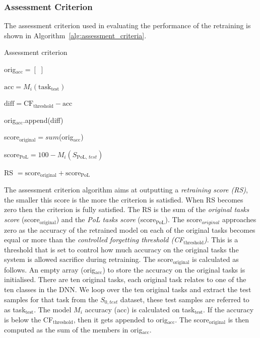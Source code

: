 \subsubsection{Assessment Criterion}
The assessment criterion used in evaluating the performance of the retraining is shown in Algorithm~\ref{alg:assessment_criteria}.
%
\begin{algorithm}
\caption{Assessment criterion}\label{alg:assessment_criteria}
\begin{algorithmic}
\State orig$_{\text{acc}} = [\text{~}]$



\State $\text{acc} = M_i(\text{task}_{\text{test}})$

\State $\text{diff} = \text{CF}_{\text{threshold}} - \text{acc}$


    \State orig$_{\text{acc}}$.append(diff)
    
\EndIf


\EndFor

\State score$_{\text{original}} = sum$(orig$_{\text{acc}}$)

\State score$_{\text{PoL}} = 100 - M_i(S_{\text{PoL, }test})$

\State RS $= \text{score}_{\text{original}} + \text{score}_{\text{PoL}}$

\end{algorithmic}
\end{algorithm}
%
The assessment criterion algorithm aims at outputting a \textit{retraining score (RS)}, the smaller this score is the more the criterion is satisfied. When RS becomes zero then the criterion is fully satisfied. 
%
The RS is the sum of the \textit{original tasks score} (score$_{\text{original}}$) and the \textit{PoL tasks score} (score$_\text{{PoL}}$).
%
The score$_{original}$ approaches zero as the accuracy of the retrained model on each of the original tasks becomes equal or more than the \textit{controlled forgetting threshold (CF$_{\text{threshold}}$)}. 
%
This is a threshold that is set to control how much accuracy on the original tasks the system is allowed sacrifice during retraining. 
%
The score$_{\text{original}}$ is calculated as follows. An empty array (orig$_{\text{acc}}$) to store the accuracy on the original tasks is initialised. 
There are ten original tasks, each original task relates to one of the ten classes in the DNN. 
%
We loop over the ten original tasks and extract the test samples for that task from the $S_{0, test}$ dataset, these test samples are referred to as task$_{\text{test}}$.
%
The model $M_i$ accuracy (acc) is calculated on task$_{\text{test}}$.
%
If the accuracy is below the CF$_{\text{threshold}}$, then it gets appended to orig$_{\text{acc}}$. 
%
The score$_{\text{original}}$ is then computed as the sum of the members in orig$_{\text{acc}}$.

